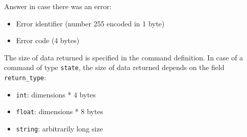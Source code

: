 \documentclass[12pt,a4paper]{report}
\begin{document}
Answer in case there was an error:
\begin{itemize}
\item Error identifier (number 255 encoded in 1 byte)
\item Error code (4 bytes)
\end{itemize}

The size of data returned is specified in the command definition. In case of a command of type \texttt{state}, the size of data returned depends on the field \texttt{return\_type}:
\begin{itemize}
\item \texttt{int}: dimensions * 4 bytes
\item \texttt{float}: dimensions * 8 bytes
\item \texttt{string}: arbitrarily long size
\end{itemize}
\end{document}
